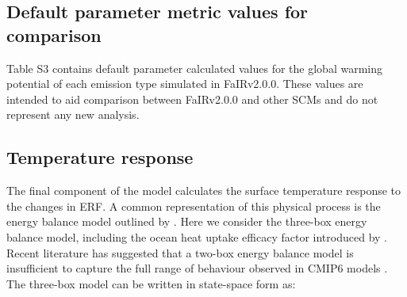 \documentclass[gmd, manuscript]{copernicus}
\providecommand{\DIFadd}[1]{{\protect\color{blue}#1}} %
\providecommand{\DIFaddbegin}{} %
\providecommand{\DIFaddend}{} %
\begin{document}
\subsection{Default parameter metric values for comparison}
Table S3 contains default parameter calculated values for the global warming potential \citep{Lashof1990} of each emission type simulated in FaIRv2.0\DIFaddbegin \DIFadd{.0}\DIFaddend . These values are intended to aid comparison between FaIRv2.0\DIFaddbegin \DIFadd{.0 }\DIFaddend and other SCMs and do not represent any new analysis.
\subsection{Temperature response} \label{temp_response}
The final component of the model calculates the surface temperature response to the changes in ERF. A common representation of this physical process is the energy balance model outlined by \cite{Geoffroy2013}. Here we consider the three-box energy balance model, including the ocean heat uptake efficacy factor introduced by \cite{Held2010}. Recent literature has suggested that a two-box energy balance model is insufficient to capture the full range of behaviour observed in CMIP6 models \citep{Tsutsui2020,Tsutsui2017,Cummins2020}. The three-box model can be written in state-space form as:\DIFaddbegin \\
\end{document}
